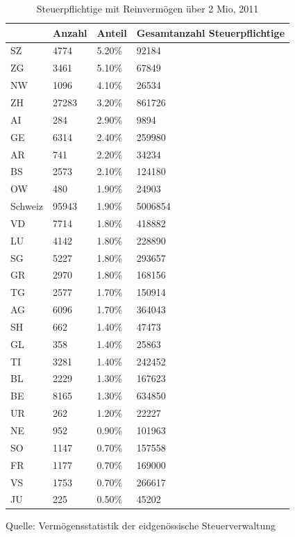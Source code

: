 \documentclass[a4paper, 12pt,liststotoc]{scrartcl}
\numberwithin{equation}{section}
\begin{document}
\begin{table}
\centering
\footnotesize
\caption{Steuerpflichtige mit Reinvermögen über 2 Mio, 2011}
\begin{tabular}{L{2.2cm}L{2.5cm}L{2.5cm}L{3cm}}
\toprule
~ & Anzahl & Anteil & Gesamtanzahl Steuerpflichtige\\
\midrule
SZ & 4774 & 5.20\% & 92184\\
ZG & 3461 & 5.10\% & 67849\\
NW & 1096 & 4.10\% & 26534\\
ZH & 27283 & 3.20\% & 861726\\
AI & 284 & 2.90\% & 9894\\
GE & 6314 & 2.40\% & 259980\\
AR & 741 & 2.20\% & 34234\\
BS & 2573 & 2.10\% & 124180\\
OW & 480 & 1.90\% & 24903\\
\midrule
Schweiz & 95943 & 1.90\% &
5006854\\
\midrule
VD & 7714 & 1.80\% & 418882\\
LU & 4142 & 1.80\% & 228890\\
SG & 5227 & 1.80\% & 293657\\
GR & 2970 & 1.80\% & 168156\\
TG & 2577 & 1.70\% & 150914\\
AG & 6096 & 1.70\% & 364043\\
SH & 662 & 1.40\% & 47473\\
GL & 358 & 1.40\% & 25863\\
TI & 3281 & 1.40\% & 242452\\
BL & 2229 & 1.30\% & 167623\\
\midrule
BE & 8165 & 1.30\% &
634850\\
\midrule
UR & 262 & 1.20\% & 22227\\
NE & 952 & 0.90\% & 101963\\
SO & 1147 & 0.70\% & 157558\\
FR & 1177 & 0.70\% & 169000\\
VS & 1753 & 0.70\% & 266617\\
JU & 225 & 0.50\% & 45202\\
\bottomrule
\end{tabular}
\begin{tablenotes}
\small
\item Quelle: Vermögensstatistik der eidgenössische Steuerverwaltung
\end{tablenotes}
\label{tab:steuerpflichtige}
\end{table}

\newpage
\printbibliography[heading=bibintoc]
\end{document}

